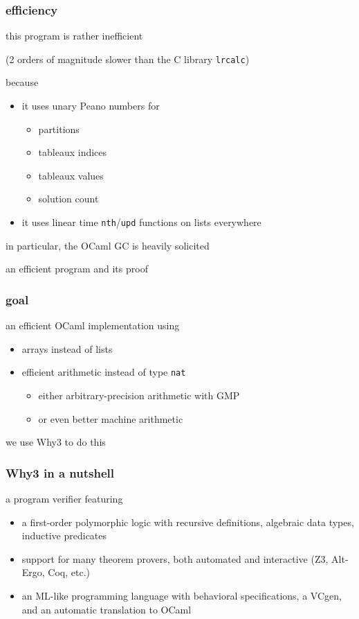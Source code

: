 \documentclass{beamer}
\let\emph\alert
\begin{document}
\begin{frame}\frametitle{efficiency}
  this program is rather inefficient

  (2 orders of magnitude slower than the C library \texttt{lrcalc})

  \bigskip
  because
  \begin{itemize}
  \item it uses \emph{unary Peano numbers} for
    \begin{itemize}
    \item partitions
    \item tableaux indices
    \item tableaux values
    \item solution count
    \end{itemize}
  \item it uses \emph{linear time} \texttt{nth}/\texttt{upd} functions on lists
    everywhere
  \end{itemize}

  \bigskip
  in particular, the OCaml GC is heavily solicited
\end{frame}

\begin{frame}
  \begin{center}
    \emph{an efficient program and its proof} \\
    \hrulefill
  \end{center}
\end{frame}

\begin{frame}\frametitle{goal}
  an efficient OCaml implementation using
  \begin{itemize}
  \item arrays instead of lists
  \item efficient arithmetic instead of type \texttt{nat}
    \begin{itemize}
    \item either arbitrary-precision arithmetic with GMP
    \item or even better machine arithmetic
    \end{itemize}
  \end{itemize}

  \bigskip\bigskip
  we use Why3 to do this
\end{frame}

\begin{frame}\frametitle{Why3 in a nutshell}
  a program verifier featuring
  \begin{itemize}
  \item a \emph{first-order polymorphic logic} with recursive definitions,
    algebraic data types, inductive predicates
  \item support for \emph{many theorem provers}, both automated and
    interactive (Z3, Alt-Ergo, Coq, etc.)
  \item an \emph{ML-like programming language} with behavioral specifications,
    a VCgen, and an automatic translation to OCaml
  \end{itemize}
\end{frame}
\end{document}
